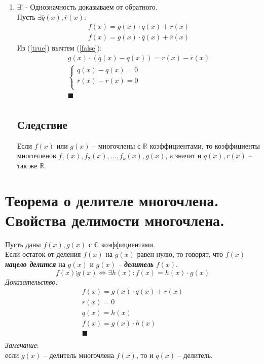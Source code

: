 \documentclass[12pt, fleqn]{article}
\begin{document}
\begin{enumerate}
\begin{enumerate}
	\end{enumerate}
	\item $\exists!$ - Однозначность доказываем от обратного.\\
	Пусть $\exists \overline{q}(x), \overline{r}(x)\colon$
	\begin{align}
		f(x) = g(x)\cdot q(x)+r(x) \label{true}\\
		f(x) = g(x)\cdot \overline{q}(x)+\overline{r}(x) \label{false}
	\end{align}
	Из (\ref{true}) вычтем (\ref{false}):
	\begin{multline*}
		g(x)\cdot\left(\overline{q}(x)-q(x)\right) = r(x) - \overline{r}(x)\\
		\begin{cases}
			\overline{q}(x) - q(x) = 0 \\
			\overline{r}(x) - r(x) = 0\\
		\end{cases}\\
		\blacksquare\\
	\end{multline*}
\subsection*{Следствие}
Если $f(x)$ или $g(x)$ -- многочлены с $\mathbb{R}$ коэффициентами, то коэффициенты многочленов $f_1(x), f_2(x), \dots ,f_k(x), g(x)$, а значит и $q(x), r(x)$ -- так же $\mathbb{R}$.
\end{enumerate}
\section{Теорема о делителе многочлена. Свойства делимости многочлена.}
Пусть даны $f(x), g(x)$ с $\mathbb{C}$ коэффициентами.\\
Если остаток от деления $f(x)$ на $g(x)$ равен нулю, то говорят, что $f(x)$ \textbf{\textit{нацело делится}} на $g(x)$ и $g(x)$ -- \textbf{\textit{делитель }}$f(x)$.
$$f(x) \vdots g(x)\Leftrightarrow \exists h(x)\colon f(x)=h(x)\cdot g(x)$$
\textit{Доказательство:}
\begin{multline*}
	f(x) = g(x)\cdot q(x)+r(x)\\
	r(x)=0\\
	q(x) = h(x)\\
	f(x) = g(x)\cdot h(x)\\
	\blacksquare\\
\end{multline*}
\textit{Замечание}:\\
если $g(x)$ -- делитель многочлена $f(x)$, то и $q(x)$ -- делитель.
\end{document}
